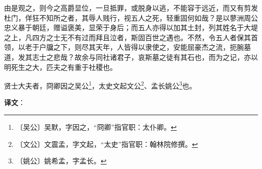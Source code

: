 \documentclass[12pt,UTF-8,openany]{ctexbook}
\begin{document}
\begin{normalsize}
    由是观之，则今之高爵显位，一旦抵罪，或脱身以逃，不能容于远近，而又有剪发杜门，佯狂不知所之者，其辱人贱行，视五人之死，轻重固何如哉？是以蓼洲周公忠义暴于朝廷，赠谥褒美，显荣于身后；而五人亦得以加其土封，列其姓名于大堤之上，凡四方之士无不有过而拜且泣者，斯固百世之遇也。不然，令五人者保其首领，以老于户牖之下，则尽其天年，人皆得以隶使之，安能屈豪杰之流，扼腕墓道，发其志士之悲哉？故余与同社诸君子，哀斯墓之徒有其石也，而为之记，亦以明死生之大，匹夫之有重于社稷也。
    
    贤士大夫者，冏卿因之吴公\footnote{〔吴公〕吴默，字因之，“冏卿”指官职：太仆卿。}，太史文起文公\footnote{〔文公〕文震孟，字文起，“太史”指官职：翰林院修撰。}、孟长姚公\footnote{〔姚公〕姚希孟，字孟长。}也。
\end{normalsize}


\newpage

\textbf{译文}：

\vspace{1em}
\end{document}
